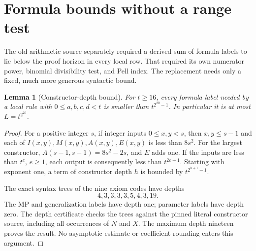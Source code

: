 \documentclass[11pt]{article}
\newtheorem{lemma}[theorem]{Lemma}
\theoremstyle{definition}\newtheorem{remark}[theorem]{Remark}
\begin{document}
\section{Formula bounds without a range test}

The old arithmetic source separately required a derived sum of formula
labels to lie below the proof horizon in every local row. That required
its own numerator power, binomial divisibility test, and Pell index.
The replacement needs only a fixed, much more generous syntactic bound.

\begin{lemma}[Constructor-depth bound]\label{lem:depth}
For $t\ge16$, every formula label needed by a local rule with
$0\le a,b,c,d<t$ is smaller than $t^{2^{20}-1}$.
In particular it is at most $L=t^{2^{20}}$.
\end{lemma}
\begin{proof}
For a positive integer $s$, if integer inputs $0\le x,y<s$, then
$x,y\le s-1$ and each of
$I(x,y),M(x,y),A(x,y),E(x,y)$ is less than $8s^2$.
For the largest constructor,
$A(s-1,s-1)=8s^2-2s$, and $E$ adds one. If the inputs are
less than $t^e$, $e\ge1$, each output is consequently less than
$t^{2e+1}$. Starting with exponent one, a term of constructor depth
$h$ is bounded by $t^{2^{h+1}-1}$.

The exact syntax trees of the nine axiom codes have depths
\[
                 4,3,3,3,3,5,4,3,19.
\]
The MP and generalization labels have depth one; parameter labels have
depth zero. The depth certificate checks the trees against the pinned
literal constructor source, including all occurrences of $N$ and $X$.
The maximum depth nineteen proves the result. No asymptotic estimate or
coefficient rounding enters this argument.
\end{proof}
\end{document}
